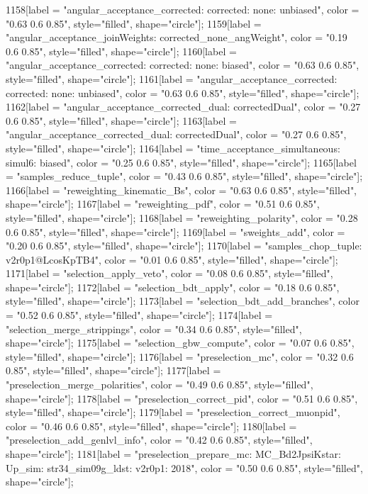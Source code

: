{	1158[label = "angular_acceptance_corrected\nangacc: corrected\ncsp: none\ntrigger: unbiased", color = "0.63 0.6 0.85", style="filled", shape="circle"];
	1159[label = "angular_acceptance_joinWeights\nwflag: corrected_none_angWeight", color = "0.19 0.6 0.85", style="filled", shape="circle"];
	1160[label = "angular_acceptance_corrected\nangacc: corrected\ncsp: none\ntrigger: biased", color = "0.63 0.6 0.85", style="filled", shape="circle"];
	1161[label = "angular_acceptance_corrected\nangacc: corrected\ncsp: none\ntrigger: unbiased", color = "0.63 0.6 0.85", style="filled", shape="circle"];
	1162[label = "angular_acceptance_corrected_dual\nstep: correctedDual", color = "0.27 0.6 0.85", style="filled", shape="circle"];
	1163[label = "angular_acceptance_corrected_dual\nstep: correctedDual", color = "0.27 0.6 0.85", style="filled", shape="circle"];
	1164[label = "time_acceptance_simultaneous\ntimeacc: simul6\ntrigger: biased", color = "0.25 0.6 0.85", style="filled", shape="circle"];
	1165[label = "samples_reduce_tuple", color = "0.43 0.6 0.85", style="filled", shape="circle"];
	1166[label = "reweighting_kinematic_Bs", color = "0.63 0.6 0.85", style="filled", shape="circle"];
	1167[label = "reweighting_pdf", color = "0.51 0.6 0.85", style="filled", shape="circle"];
	1168[label = "reweighting_polarity", color = "0.28 0.6 0.85", style="filled", shape="circle"];
	1169[label = "sweights_add", color = "0.20 0.6 0.85", style="filled", shape="circle"];
	1170[label = "samples_chop_tuple\nversion: v2r0p1@LcosKpTB4", color = "0.01 0.6 0.85", style="filled", shape="circle"];
	1171[label = "selection_apply_veto", color = "0.08 0.6 0.85", style="filled", shape="circle"];
	1172[label = "selection_bdt_apply", color = "0.18 0.6 0.85", style="filled", shape="circle"];
	1173[label = "selection_bdt_add_branches", color = "0.52 0.6 0.85", style="filled", shape="circle"];
	1174[label = "selection_merge_strippings", color = "0.34 0.6 0.85", style="filled", shape="circle"];
	1175[label = "selection_gbw_compute", color = "0.07 0.6 0.85", style="filled", shape="circle"];
	1176[label = "preselection_mc", color = "0.32 0.6 0.85", style="filled", shape="circle"];
	1177[label = "preselection_merge_polarities", color = "0.49 0.6 0.85", style="filled", shape="circle"];
	1178[label = "preselection_correct_pid", color = "0.51 0.6 0.85", style="filled", shape="circle"];
	1179[label = "preselection_correct_muonpid", color = "0.46 0.6 0.85", style="filled", shape="circle"];
	1180[label = "preselection_add_genlvl_info", color = "0.42 0.6 0.85", style="filled", shape="circle"];
	1181[label = "preselection_prepare_mc\nmode: MC_Bd2JpsiKstar\npolarity: Up\nstrip_sim: str34_sim09g_ldst\nversion: v2r0p1\nyear: 2018", color = "0.50 0.6 0.85", style="filled", shape="circle"];
}
